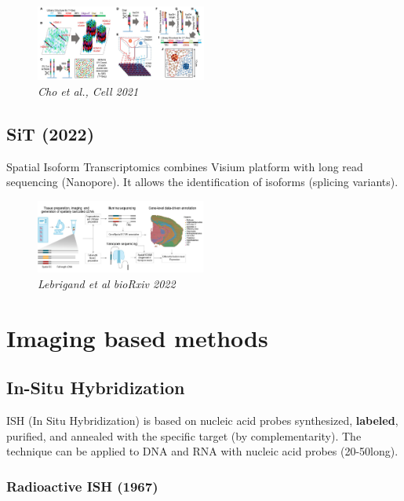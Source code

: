 \begin{figure}
\centering
\includegraphics[width=0.5\textwidth]{images/Screenshot_3.png}
\caption{\emph{Cho et al., Cell 2021}}
\end{figure}


\hypertarget{sit-2022}{%
\subsection{SiT (2022)}\label{sit-2022}}

Spatial Isoform Transcriptomics combines Visium platform with long read
sequencing (Nanopore). It allows the identification of isoforms
(splicing variants).

\begin{figure}
\centering
\includegraphics[width=0.5\textwidth]{images/Screenshot_4.png}
\caption{\emph{Lebrigand et al bioRxiv 2022}}
\end{figure}

\hypertarget{imaging-based-methods}{%
\section{Imaging based methods}\label{imaging-based-methods}}

\hypertarget{in-situ-hybridization}{%
\subsection{In-Situ Hybridization}\label{in-situ-hybridization}}

ISH (In Situ Hybridization) is based on nucleic acid probes synthesized,
\textbf{labeled}, purified, and annealed with the specific target (by
complementarity). The technique can be applied to DNA and RNA with
nucleic acid probes (20-50long).

\hypertarget{radioactive-ish-1967}{%
\subsubsection{Radioactive ISH (1967)}\label{radioactive-ish-1967}}

